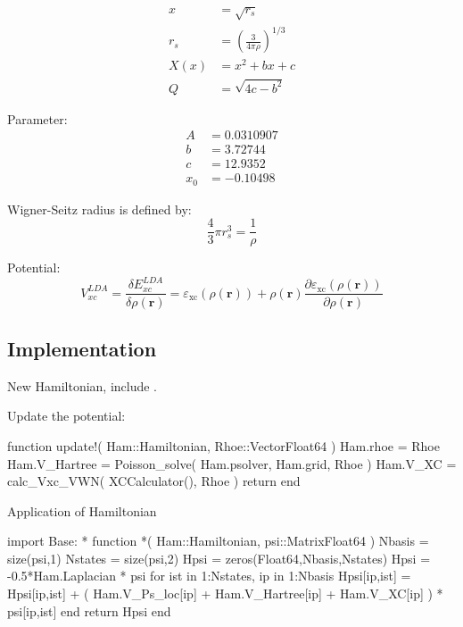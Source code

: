 \begin{align}
x & = \sqrt{r_{s}} \\
r_s & = \left( \frac{3}{4\pi\rho} \right)^{1/3} \\
X(x) & = x^2 + bx + c \\
Q & = \sqrt{4c - b^2}
\end{align}

Parameter:
\begin{align}
A & = 0.0310907 \\
b & = 3.72744 \\
c & = 12.9352 \\
x_0 & = -0.10498
\end{align}

Wigner-Seitz radius is defined by:
\begin{equation}
\frac{4}{3}\pi r^{3}_{s} = \frac{1}{\rho}
\end{equation}

Potential:
\begin{equation}
V^{LDA}_{xc} = \frac{\delta E^{LDA}_{xc}}{\delta \rho(\mathbf{r})} = 
\varepsilon_{\mathrm{xc}}( \rho(\mathbf{r}) ) + \rho(\mathbf{r})
\frac{\partial \varepsilon_{\mathrm{xc}}( \rho(\mathbf{r}) )}{\partial\rho(\mathbf{r})}
\end{equation}


\subsection{Implementation}

New Hamiltonian, include .

Update the potential:

\begin{juliacode}
function update!( Ham::Hamiltonian, Rhoe::Vector{Float64} )
  Ham.rhoe = Rhoe
  Ham.V_Hartree = Poisson_solve( Ham.psolver, Ham.grid, Rhoe )
  Ham.V_XC = calc_Vxc_VWN( XCCalculator(), Rhoe )
  return
end
\end{juliacode}

Application of Hamiltonian

\begin{juliacode}
import Base: *
function *( Ham::Hamiltonian, psi::Matrix{Float64} )
  Nbasis = size(psi,1)
  Nstates = size(psi,2)
  Hpsi = zeros(Float64,Nbasis,Nstates)
  Hpsi = -0.5*Ham.Laplacian * psi
  for ist in 1:Nstates, ip in 1:Nbasis
    Hpsi[ip,ist] = Hpsi[ip,ist] + ( Ham.V_Ps_loc[ip] + Ham.V_Hartree[ip] +
                   Ham.V_XC[ip] ) * psi[ip,ist]
  end
  return Hpsi
end
\end{juliacode}

